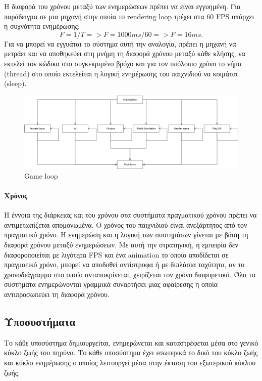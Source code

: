 	Η διαφορά του χρόνου μεταξύ των ενημερώσεων πρέπει να είναι εγγυημένη. Για παράδειγμα σε μια μηχανή στην οποία το rendering loop τρέχει στα 60 \gls{FPS} υπάρχει η συχνότητα ενημέρωσης:
	\begin{equation}
	 F = 1/T =>  F = 1000ms/60 => F = 16ms. 
	\end{equation}
	Για να μπορεί να εγγυάται το σύστημα αυτή την αναλογία, πρέπει η μηχανή να μετράει και να αποθηκεύει στη μνήμη τη διαφορά χρόνου μεταξύ κάθε κλήσης, να εκτελεί τον κώδικα στο συγκεκριμένο βρόχο και για τον υπόλοιπο χρόνο το νήμα (thread) στο οποίο εκτελείται η λογική ενημέρωσης του παιχνιδιού να κοιμάται (sleep).
	
	\begin{figure}[h!]
		\centering
		\includegraphics[width=160mm]{Images/gameloops_update}
		\caption{Game loop}
		\label{fig:gameloops}
	\end{figure}
		
	\paragraph{Χρόνος}
	Η έννοια της διάρκειας και του χρόνου στα συστήματα πραγματικού χρόνου πρέπει να αντιμετωπίζεται απομονωμένα. Ο χρόνος του παιχνιδιού  είναι ανεξάρτητος από τον πραγματικό χρόνο. Η ενημερώση και η λογική των συστημάτων γίνεται με βάση τη διαφορά χρόνου μεταξύ ενημερώσεων. Με αυτή την στρατηγική, η εμπειρία δεν διαφοροποιείται με λιγότερα \gls{FPS} και ένα animation το οποίο αποδίδεται σε πραγματικό χρόνο, μπορεί να αποδοθεί αντίστροφα ή με διπλάσια ταχύτητα, αν το χρονοδιάγραμμα στο οποίο ανταποκρίνεται, χειρίζεται τον χρόνο διαφορετικά.
	Όλα τα συστήματα ενημερώνονται γραμμικά συναρτήσει μιας αφαίρεσης η οποία αντιπροσωπεύει τη διαφορά χρόνου.
	\subsection{Υποσυστήματα}
	Το κάθε υποσύστημα δημιουργείται, ενημερώνεται και καταστρέφεται μέσα στο γενικό κύκλο ζωής του πηρύνα. Το κάθε υποσύστημα έχει εσωτερικά το δικό του κύκλο ζωής και κύκλο ενημέρωσης ο οποίος λειτουργεί μέσα στην έκταση του εξωτερικού κύκλου ζωής.
	
